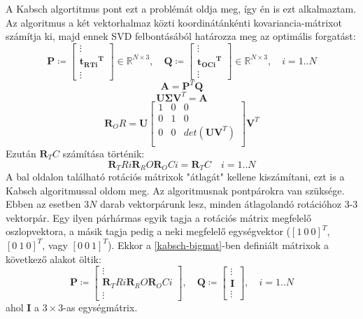 	A Kabsch algortitmus pont ezt a problémát oldja meg, így én is ezt alkalmaztam. Az algoritmus a két vektorhalmaz közti koordinátánkénti kovariancia-mátrixot számítja ki, majd ennek SVD felbontásából határozza meg az optimális forgatást:
	\begin{equation}
	\label{kabsch-bigmat}
	\mathbf{P} \coloneqq \left[ \begin{matrix}
		\vdots \\
		\mathbf{{t_{RTi}}^T} \\
		\vdots
		\end{matrix} \right] \in \mathbb{R}^{N \times 3} , \quad
	\mathbf{Q} \coloneqq \left[ \begin{matrix}
		\vdots \\
		\mathbf{{t_{OCi}}^T} \\
		\vdots
		\end{matrix} \right] \in \mathbb{R}^{N \times 3} , \quad
		i = 1..N
	\end{equation}
	\begin{equation}
	\mathbf{A} = \mathbf{P}^T\mathbf{Q}
	\end{equation}
	\begin{equation}
	\mathbf{U \Sigma V}^T = \mathbf{A}
	\end{equation}
	\begin{equation}
	\mathbf{R}_OR = \mathbf{U}\left[
\begin{matrix}
1 & 0 & 0 \\
0 & 1 & 0 \\
0 & 0 & det(\mathbf{UV}^T) \\
\end{matrix}
	 \right]\mathbf{V}^T
	\end{equation}
	Ezután $\mathbf{R}_TC$ számítása történik: 
	\begin{equation}
	\mathbf{R}_TRi\mathbf{R}_RO\mathbf{R}_OCi = \mathbf{R}_TC\quad i = 1 .. N
	\end{equation}
	A bal oldalon található rotációs mátrixok "átlagát" kellene kiszámítani, ezt is a Kabsch algoritmussal oldom meg. Az algoritmusnak pontpárokra van szüksége. Ebben az esetben $3N$ darab vektorpárunk lesz, minden átlagolandó rotációhoz 3-3 vektorpár. Egy ilyen párhármas egyik tagja a rotációs mátrix megfelelő oszlopvektora, a másik tagja pedig a neki megfelelő egységvektor ($\left[1\:0\:0 \right]^T $, $\left[0\: 1\: 0 \right]^T $, vagy $\left[0\: 0\: 1 \right]^T $). Ekkor a \eqref{kabsch-bigmat}-ben definiált mátrixok a következő alakot öltik:
	\begin{equation}
	\mathbf{P} \coloneqq \left[ \begin{matrix}
		\vdots \\
		\mathbf{R}_TRi\mathbf{R}_RO\mathbf{R}_OCi \\
		\vdots
		\end{matrix} \right], \quad
	\mathbf{Q} \coloneqq \left[ \begin{matrix}
		\vdots \\
		\mathbf{I} \\
		\vdots
		\end{matrix} \right], \quad
		i = 1..N
	\end{equation}
	ahol $\mathbf{I}$ a $3\times 3$-as egységmátrix.
	
